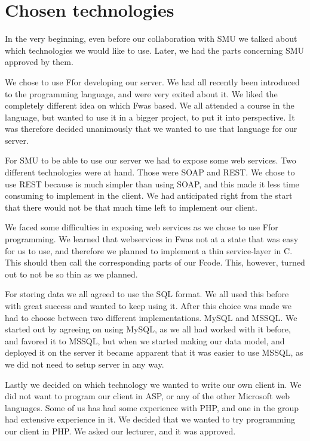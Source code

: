 \section{Chosen technologies}
In the very beginning, even before our collaboration with SMU we talked about which technologies we would like to use. Later, we had the parts concerning SMU approved by them.

We chose to use F\Sh for developing our server. We had all recently been introduced to the programming language, and were very exited about it. We liked the completely different idea on which F\Sh was based. We all attended a course in the language, but wanted to use it in a bigger project, to put it into perspective. It was therefore decided unanimously that we wanted to use that language for our server.

For SMU to be able to use our server we had to expose some web services. Two different technologies were at hand. Those were SOAP and REST. We chose to use REST because is much simpler than using SOAP, and this made it less time consuming to implement in the client. We had anticipated right from the start that there would not be that much time left to implement our client. 

We faced some difficulties in exposing web services as we chose to use F\Sh for programming. We learned that webservices in F\Sh was not at a state that was easy for us to use, and therefore we planned to implement a thin service-layer in C\Sh. This should then call the corresponding parts of our F\Sh code. This, however, turned out to not be so thin as we planned.

For storing data we all agreed to use the SQL format. We all used this before with great success and wanted to keep using it. After this choice was made we had to choose between two different implementations. MySQL and MSSQL. We started out by agreeing on using MySQL, as we all had worked with it before, and favored it to MSSQL, but when we started making our data model, and deployed it on the server it became apparent that it was easier to use MSSQL, as we did not need to setup server in any way.

Lastly we decided on which technology we wanted to write our own client in. We did not want to program our client in ASP, or any of the other Microsoft web languages. Some of us has had some experience with PHP, and one in the group had extensive experience in it. We decided that we wanted to try programming our client in PHP. We asked our lecturer, and it was approved.
\newpage